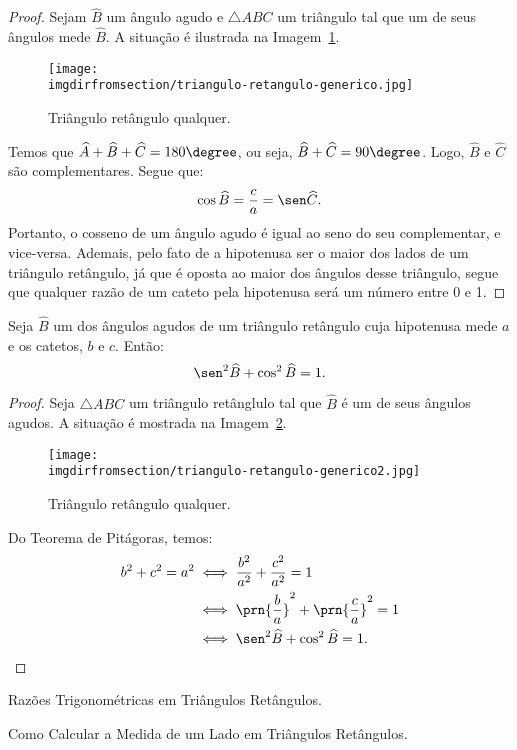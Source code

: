 \begin{proof}
    Sejam $\widehat B$ um ângulo agudo e $\triangle ABC$ um triângulo tal que um de seus ângulos mede $\widehat B$.
    A situação é ilustrada na Imagem~\ref{img:triangulo-retangulo-generico}.
    \begin{figure}[H]
        \centering
        \texttt{[image: \\imgdirfromsection/triangulo-retangulo-generico.jpg]}
        \caption{Triângulo retângulo qualquer.}
        \label{img:triangulo-retangulo-generico}
    \end{figure}
    Temos que $\widehat A + \widehat B  + \widehat C = 180\degree$, ou seja, $\widehat B  + \widehat C = 90\degree$.
    Logo, $\widehat B$ e $\widehat C$ são complementares. Segue que:
    $$\cos \widehat B = \frac c a = \sen \widehat C.$$ Portanto, o cosseno de um ângulo agudo é igual ao seno do seu complementar,
    e vice-versa. Ademais, pelo fato de a hipotenusa ser o maior dos lados de um triângulo retângulo, já que é oposta ao 
    maior dos ângulos desse triângulo, segue que qualquer razão de um cateto pela hipotenusa será um número entre 0 e 1.
\end{proof}

\begin{proposition}
Seja $\widehat B$ um dos ângulos agudos de um triângulo retângulo
cuja hipotenusa mede $a$ e os catetos, $b$ e $c$. Então:
$$\sen^2 \widehat B + \cos^2 \widehat B = 1.$$
\end{proposition}

\begin{proof}
    Seja $\triangle ABC$ um triângulo retânglulo tal que $\widehat B$ é um de seus ângulos agudos. A situação é 
    mostrada na Imagem~\ref{img:prova-relacao-fundamental-trigonometria}.
    \begin{figure}[H]
        \centering
        \texttt{[image: \\imgdirfromsection/triangulo-retangulo-generico2.jpg]}
        \caption{Triângulo retângulo qualquer.}
        \label{img:prova-relacao-fundamental-trigonometria}
    \end{figure}
    Do Teorema de Pitágoras, temos:
    \begin{align*}
        b^2 + c^2 = a^2 &\iff \frac{b^2}{a^2} + \frac{c^2}{a^2} = 1 \\ &\iff \prn{\frac b a}^2 + \prn{\frac c a}^2 = 1 \\ 
        &\iff \sen^2 \widehat B  +  \cos^2 \widehat B= 1.
    \end{align*}
\end{proof}

\begin{onlineact}
    {Razões Trigonométricas em Triângulos
Retângulos}.
\end{onlineact}

\begin{onlineact}
    {Como Calcular a Medida de um Lado em Triângulos Retângulos}.
\end{onlineact}
